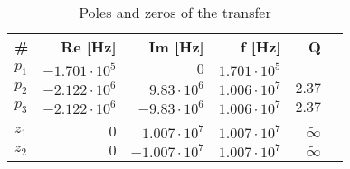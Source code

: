 \begin{table}[H]
\centering
\begin{tabular}[c]{lrrrrr}
\textbf{\#} & \textbf{Re [Hz]} & \textbf{Im [Hz]} & \textbf{f [Hz]} & \textbf{Q} \\ 
\rowcolor{myyellow}
$p_{\mathrm{1}}$ &$-1.701 \cdot 10^{5}$ &$0$ &$1.701 \cdot 10^{5}$ \\ 
$p_{\mathrm{2}}$ &$-2.122 \cdot 10^{6}$ &$9.83 \cdot 10^{6}$ &$1.006 \cdot 10^{7}$ &$2.37$ \\ 
\rowcolor{myyellow}
$p_{\mathrm{3}}$ &$-2.122 \cdot 10^{6}$ &$-9.83 \cdot 10^{6}$ &$1.006 \cdot 10^{7}$ &$2.37$ \\ 
\small{ } \\ 
\rowcolor{myyellow}
$z_{\mathrm{1}}$ &$0$ &$1.007 \cdot 10^{7}$ &$1.007 \cdot 10^{7}$ &$\tilde{\infty}$ \\ 
$z_{\mathrm{2}}$ &$0$ &$-1.007 \cdot 10^{7}$ &$1.007 \cdot 10^{7}$ &$\tilde{\infty}$ \\ 
\end{tabular}
\caption{Poles and zeros of the transfer}
\label{tab-pz}
\end{table}

